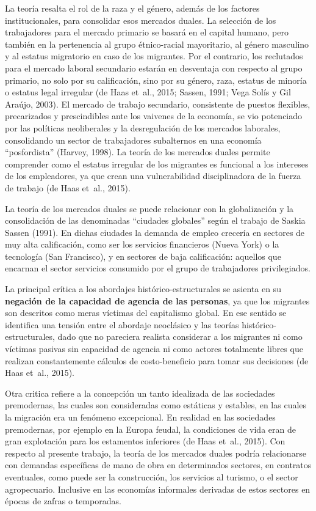 \documentclass[12pt,spanish,]{article}
\begin{document}
La teoría resalta el rol de la raza y el género, además de los factores
institucionales, para consolidar esos mercados duales. La selección de
los trabajadores para el mercado primario se basará en el capital
humano, pero también en la pertenencia al grupo étnico-racial
mayoritario, al género masculino y al estatus migratorio en caso de los
migrantes. Por el contrario, los reclutados para el mercado laboral
secundario estarán en desventaja con respecto al grupo primario, no solo
por su calificación, sino por su género, raza, estatus de minoría o
estatus legal irregular (de Haas et~al., 2015; Sassen, 1991; Vega Solís
y Gil Araújo, 2003). El mercado de trabajo secundario, consistente de
puestos flexibles, precarizados y prescindibles ante los vaivenes de la
economía, se vio potenciado por las políticas neoliberales y la
desregulación de los mercados laborales, consolidando un sector de
trabajadores subalternos en una economía ``posfordista'' (Harvey, 1998).
La teoría de los mercados duales permite comprender como el estatus
irregular de los migrantes es funcional a los intereses de los
empleadores, ya que crean una vulnerabilidad disciplinadora de la fuerza
de trabajo (de Haas et~al., 2015).

La teoría de los mercados duales se puede relacionar con la
globalización y la consolidación de las denominadas ``ciudades
globales'' según el trabajo de Saskia Sassen (1991). En dichas ciudades
la demanda de empleo crecería en sectores de muy alta calificación, como
ser los servicios financieros (Nueva York) o la tecnología (San
Francisco), y en sectores de baja calificación: aquellos que encarnan el
sector servicios consumido por el grupo de trabajadores privilegiados.

La principal crítica a los abordajes histórico-estructurales se asienta
en su \textbf{negación de la capacidad de agencia de las personas}, ya
que los migrantes son descritos como meras víctimas del capitalismo
global. En ese sentido se identifica una tensión entre el abordaje
neoclásico y las teorías histórico-estructurales, dado que no pareciera
realista considerar a los migrantes ni como víctimas pasivas sin
capacidad de agencia ni como actores totalmente libres que realizan
constantemente cálculos de costo-beneficio para tomar sus decisiones (de
Haas et~al., 2015).

Otra critica refiere a la concepción un tanto idealizada de las
sociedades premodernas, las cuales son consideradas como estáticas y
estables, en las cuales la migración era un fenómeno excepcional. En
realidad en las sociedades premodernas, por ejemplo en la Europa feudal,
la condiciones de vida eran de gran explotación para los estamentos
inferiores (de Haas et~al., 2015). Con respecto al presente trabajo, la
teoría de los mercados duales podría relacionarse con demandas
específicas de mano de obra en determinados sectores, en contratos
eventuales, como puede ser la construcción, los servicios al turismo, o
el sector agropecuario. Inclusive en las economías informales derivadas
de estos sectores en épocas de zafras o temporadas.
\end{document}
